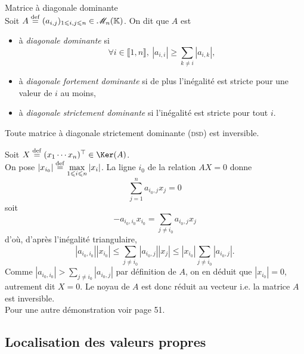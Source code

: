 \begin{defi}{Matrice à diagonale dominante} 
    \\
    Soit $A \overset{\mathrm{\tiny def}}{=} (a_{i,j})_{1 \leqslant i, j \leqslant n} \in \mathscr{M}_n(\mathbb{K})$. On dit que $A$ est 
    \begin{itemize}
        \item à \emph{diagonale dominante} si
        $$\forall i \in \llbracket 1, n \rrbracket,\ |a_{i,i}| \geqslant \sum_{k \not = i} |a_{i,k}|,$$
        \item à \emph{diagonale fortement dominante} si de plus l'inégalité est stricte pour une valeur de $i$ au moins,
        \item à \emph{diagonale strictement dominante} si l'inégalité est stricte pour tout $i$. 
    \end{itemize}
\end{defi}

\begin{lemme} \label{lemme_hadamard}
    Toute matrice à diagonale strictement dominante (\textsc{dsd}) est inversible.
\end{lemme}


\begin{preuve}
    Soit $X \defeq \Trsp{(x_1 \cdots x_n)} \in \Ker(A)$. \\
    On pose $\displaystyle \left |x_{i_0} \right| \overset{\mathrm{\tiny def}}{=} \max_{1 \leqslant i \leqslant n} |x_i|$. La ligne $i_0$ de la relation $AX = 0$ donne
    $$\sum_{j=1}^n a_{i_0,j}x_j = 0$$
    soit
    $$-a_{i_0, i_0} x_{i_0} = \sum_{j \not = i_0} a_{i_0,j} x_j$$
    d'où, d'après l'inégalité triangulaire,
    $$|a_{i_0, i_0}| |x_{i_0}| \leqslant \sum_{j \not = i_0} |a_{i_0,j}| |x_j| \leqslant |x_{i_0}| \sum_{j \not = i_0} |a_{i_0, j}|.$$
    Comme $|a_{i_0, i_0}| > \sum\limits_{j \not = i_0} |a_{i_0, j}|$ par définition de $A$, on en déduit que
    $|x_{i_0}| = 0$, autrement dit $X = 0$. Le noyau de $A$ est donc réduit au vecteur i.e. la matrice $A$ est inversible. \\
    Pour une autre démonstration voir \cite{matrices} page 51. 
\end{preuve}

\subsection{Localisation des valeurs propres}

